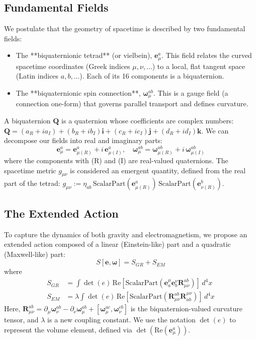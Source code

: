 \documentclass[11pt, a4paper]{article}
\begin{document}
\subsection{Fundamental Fields}
We postulate that the geometry of spacetime is described by two fundamental fields:
\begin{itemize}
  \item The **biquaternionic tetrad** (or vielbein), \( \mathbf{e}^a_\mu \). This field relates the curved spacetime coordinates (Greek indices \( \mu, \nu, \dots \)) to a local, flat tangent space (Latin indices \( a, b, \dots \)). Each of its 16 components is a biquaternion.
  \item The **biquaternionic spin connection**, \( \boldsymbol{\omega}^{ab}_\mu \). This is a gauge field (a connection one-form) that governs parallel transport and defines curvature.
\end{itemize}
A biquaternion \( \mathbf{Q} \) is a quaternion whose coefficients are complex numbers: \( \mathbf{Q} = (a_R + i a_I) + (b_R + i b_I)\mathbf{i} + (c_R + i c_I)\mathbf{j} + (d_R + i d_I)\mathbf{k} \). We can decompose our fields into real and imaginary parts:
\[ \mathbf{e}^a_\mu = \mathbf{e}^a_{\mu (R)} + i \, \mathbf{e}^a_{\mu (I)}, \quad \boldsymbol{\omega}^{ab}_\mu = \boldsymbol{\omega}^{ab}_{\mu (R)} + i \, \boldsymbol{\omega}^{ab}_{\mu (I)} \]
where the components with (R) and (I) are real-valued quaternions. The spacetime metric \( g_{\mu\nu} \) is considered an emergent quantity, defined from the real part of the tetrad: \( g_{\mu\nu} := \eta_{ab} \, \text{ScalarPart}(\mathbf{e}^a_{\mu(R)}) \, \text{ScalarPart}(\mathbf{e}^b_{\nu(R)}) \).

\subsection{The Extended Action}
To capture the dynamics of both gravity and electromagnetism, we propose an extended action composed of a linear (Einstein-like) part and a quadratic (Maxwell-like) part:
\begin{equation}
S[\mathbf{e}, \boldsymbol{\omega}] = S_{GR} + S_{EM}
\end{equation}
where
\begin{align}
S_{GR} &= \int \det(e) \, \text{Re}\left[\text{ScalarPart}(\mathbf{e}^\mu_a \mathbf{e}^\nu_b \mathbf{R}^{ab}_{\mu\nu})\right] \, d^4x \\
S_{EM} &= \lambda \int \det(e) \, \text{Re}\left[\text{ScalarPart}(\mathbf{R}_{\mu\nu}^{ab} \mathbf{R}^{\mu\nu}_{ab})\right] \, d^4x
\end{align}
Here, \( \mathbf{R}^{ab}_{\mu\nu} = \partial_\mu \boldsymbol{\omega}^{ab}_\nu - \partial_\nu \boldsymbol{\omega}^{ab}_\mu + [\boldsymbol{\omega}^{ac}_\mu, \boldsymbol{\omega}^{cb}_\nu] \) is the biquaternion-valued curvature tensor, and \( \lambda \) is a new coupling constant. We use the notation \( \det(e) \) to represent the volume element, defined via \( \det(\text{Re}(\mathbf{e}^a_\mu)) \).
\end{document}
